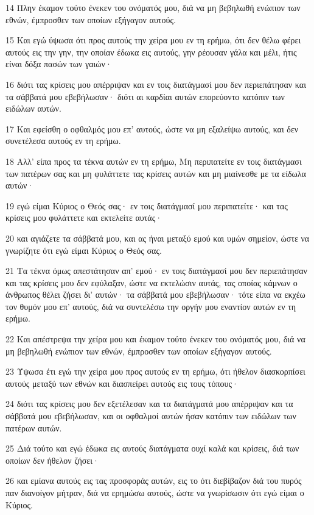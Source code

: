 \par 14 Πλην έκαμον τούτο ένεκεν του ονόματός μου, διά να μη βεβηλωθή ενώπιον των εθνών, έμπροσθεν των οποίων εξήγαγον αυτούς.
\par 15 Και εγώ ύψωσα ότι προς αυτούς την χείρα μου εν τη ερήμω, ότι δεν θέλω φέρει αυτούς εις την γην, την οποίαν έδωκα εις αυτούς, γην ρέουσαν γάλα και μέλι, ήτις είναι δόξα πασών των γαιών·
\par 16 διότι τας κρίσεις μου απέρριψαν και εν τοις διατάγμασί μου δεν περιεπάτησαν και τα σάββατά μου εβεβήλωσαν· διότι αι καρδίαι αυτών επορεύοντο κατόπιν των ειδώλων αυτών.
\par 17 Και εφείσθη ο οφθαλμός μου επ' αυτούς, ώστε να μη εξαλείψω αυτούς, και δεν συνετέλεσα αυτούς εν τη ερήμω.
\par 18 Αλλ' είπα προς τα τέκνα αυτών εν τη ερήμω, Μη περιπατείτε εν τοις διατάγμασι των πατέρων σας και μη φυλάττετε τας κρίσεις αυτών και μη μιαίνεσθε με τα είδωλα αυτών·
\par 19 εγώ είμαι Κύριος ο Θεός σας· εν τοις διατάγμασί μου περιπατείτε· και τας κρίσεις μου φυλάττετε και εκτελείτε αυτάς·
\par 20 και αγιάζετε τα σάββατά μου, και ας ήναι μεταξύ εμού και υμών σημείον, ώστε να γνωρίζητε ότι εγώ είμαι Κύριος ο Θεός σας.
\par 21 Τα τέκνα όμως απεστάτησαν απ' εμού· εν τοις διατάγμασί μου δεν περιεπάτησαν και τας κρίσεις μου δεν εφύλαξαν, ώστε να εκτελώσιν αυτάς, τας οποίας κάμνων ο άνθρωπος θέλει ζήσει δι' αυτών· τα σάββατά μου εβεβήλωσαν· τότε είπα να εκχέω τον θυμόν μου επ' αυτούς, διά να συντελέσω την οργήν μου εναντίον αυτών εν τη ερήμω.
\par 22 Και απέστρεψα την χείρα μου και έκαμον τούτο ένεκεν του ονόματός μου, διά να μη βεβηλωθή ενώπιον των εθνών, έμπροσθεν των οποίων εξήγαγον αυτούς.
\par 23 Ύψωσα έτι εγώ την χείρα μου προς αυτούς εν τη ερήμω, ότι ήθελον διασκορπίσει αυτούς μεταξύ των εθνών και διασπείρει αυτούς εις τους τόπους·
\par 24 διότι τας κρίσεις μου δεν εξετέλεσαν και τα διατάγματά μου απέρριψαν και τα σάββατά μου εβεβήλωσαν, και οι οφθαλμοί αυτών ήσαν κατόπιν των ειδώλων των πατέρων αυτών.
\par 25 Διά τούτο και εγώ έδωκα εις αυτούς διατάγματα ουχί καλά και κρίσεις, διά των οποίων δεν ήθελον ζήσει·
\par 26 και εμίανα αυτούς εις τας προσφοράς αυτών, εις το ότι διεβίβαζον διά του πυρός παν διανοίγον μήτραν, διά να ερημώσω αυτούς, ώστε να γνωρίσωσιν ότι εγώ είμαι ο Κύριος.
